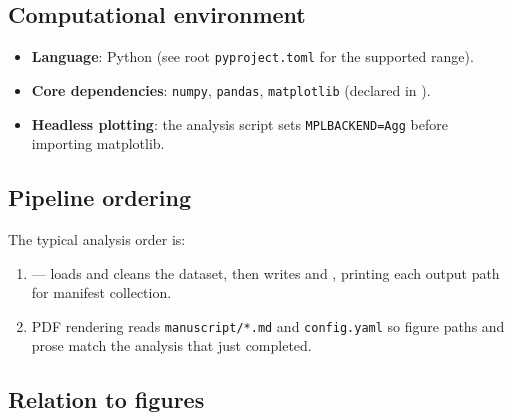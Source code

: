 \documentclass[
  english,
]{article}
\providecommand{\tightlist}{%
  \setlength{\itemsep}{0pt}\setlength{\parskip}{0pt}}
\begin{document}
\subsection{Computational environment}\label{computational-environment}

\begin{itemize}
\tightlist
\item
  \textbf{Language}: Python (see root \texttt{pyproject.toml} for the
  supported range).
\item
  \textbf{Core dependencies}: \texttt{numpy}, \texttt{pandas},
  \texttt{matplotlib} (declared in
  ).
\item
  \textbf{Headless plotting}: the analysis script sets
  \texttt{MPLBACKEND=Agg} before importing matplotlib.
\end{itemize}

\subsection{Pipeline ordering}\label{pipeline-ordering}

The typical analysis order is:

\begin{enumerate}
\def\labelenumi{\arabic{enumi}.}
\tightlist
\item
   --- loads and cleans the dataset,
  then writes  and
  , printing each output
  path for manifest collection.
\item
  PDF rendering reads \texttt{manuscript/*.md} and \texttt{config.yaml}
  so figure paths and prose match the analysis that just completed.
\end{enumerate}

\subsection{Relation to figures}\label{relation-to-figures}
\end{document}
